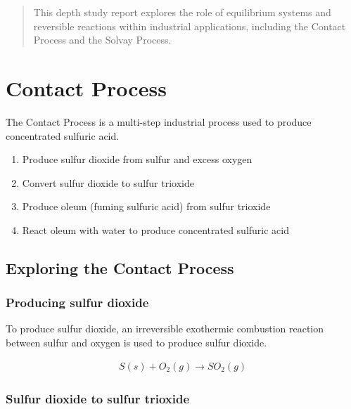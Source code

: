 \documentclass[12pt, a4paper]{article}
\begin{document}
\maketitle

\begin{abstract}
This depth study report explores the role of equilibrium systems and reversible reactions within industrial applications, including the Contact Process and the Solvay Process.
\end{abstract}






\section{Contact Process}

The Contact Process is a multi-step industrial process used to produce concentrated sulfuric acid. 

\begin{enumerate}
	\item Produce sulfur dioxide from sulfur and excess oxygen
	\item Convert sulfur dioxide to sulfur trioxide
	\item Produce oleum (fuming sulfuric acid) from sulfur trioxide
	\item React oleum with water to produce concentrated sulfuric acid
\end{enumerate}






\subsection{Exploring the Contact Process}

\subsubsection{Producing sulfur dioxide}

To produce sulfur dioxide, an irreversible exothermic combustion reaction between sulfur and oxygen is used to produce sulfur dioxide.

\begin{align}
	S(s) + O_{2}(g) \rightarrow SO_{2}(g)
\end{align}

\subsubsection{Sulfur dioxide to sulfur trioxide}
\end{document}
